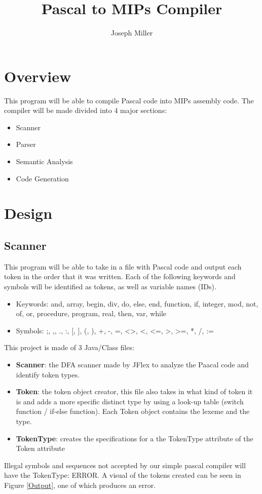 \documentclass[english]{article}
\begin{document}
\title{Pascal to MIPs Compiler}
\author{Joseph Miller}
\maketitle


\section{Overview}

This program will be able to compile Pascal code into MIPs assembly code.  The compiler will be made divided into 4 major sections:

\begin{itemize}
\item
Scanner
\item
Parser
\item
Semantic Analysis
\item
Code Generation
\end{itemize}


\par\addvspace{1cm}%
\section{Design}

\subsection{Scanner}

This program will be able to take in a file with Pascal code and output each token in the order that it was written. Each of the following keywords and symbols will be identified as tokens, as well as variable names (IDs).

\renewcommand{\labelitemi}{$\textendash$}
\begin{itemize}
\item
Keywords: and, array, begin, div, do, else, end, function, if, integer, mod, not, of, or, procedure, program, real, then, var, while
\item
Symbols: ;, ,, ., :, [, ], (, ), +, -, =, \textless\textgreater, \textless, \textless=, \textgreater, \textgreater=, *, /, :=
\end{itemize}
This project is made of 3 Java/Class files:
\begin{itemize}

\item
\textbf{Scanner}: the DFA scanner made by JFlex to analyze the Paacal code and identify token types.
\item
\textbf{Token}: the token object creator, this file also takes in what kind of token it is and adds a more specific distinct type by using a look-up table (switch function / if-else function). Each Token object contains the lexeme and the type.
\item
\textbf{TokenType}: creates the specifications for a the TokenType attribute of the Token attribute
\end{itemize}
Illegal symbols and sequences not accepted by our simple pascal compiler will have the TokenType: ERROR. A visual of the tokens created can be seen in Figure \ref{Output}, one of which produces an error.
\end{document}
